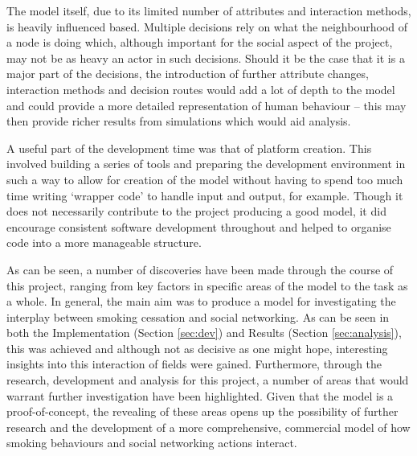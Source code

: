 \documentclass[]{report}
\begin{document}
The model itself, due to its limited number of attributes and interaction methods, is heavily influenced based. Multiple decisions rely on what the neighbourhood of a node is doing which, although important for the social aspect of the project, may not be as heavy an actor in such decisions. Should it be the case that it is a major part of the decisions, the introduction of further attribute changes, interaction methods and decision routes would add a lot of depth to the model and could provide a more detailed representation of human behaviour – this may then provide richer results from simulations which would aid analysis.

A useful part of the development time was that of platform creation. This involved building a series of tools and preparing the development environment in such a way to allow for creation of the model without having to spend too much time writing `wrapper code' to handle input and output, for example. Though it does not necessarily contribute to the project producing a good model, it did encourage consistent software development throughout and helped to organise code into a more manageable structure. 

As can be seen, a number of discoveries have been made through the course of this project, ranging from key factors in specific areas of the model to the task as a whole. In general, the main aim was to produce a model for investigating the interplay between smoking cessation and social networking. As can be seen in both the Implementation (Section \ref{sec:dev}) and Results (Section \ref{sec:analysis}), this was achieved and although not as decisive as one might hope, interesting insights into this interaction of fields were gained. Furthermore, through the research, development and analysis for this project, a number of areas that would warrant further investigation have been highlighted. Given that the model is a proof-of-concept, the revealing of these areas opens up the possibility of further research and the development of a more comprehensive, commercial model of how smoking behaviours and social networking actions interact.
%
%


\end{document}
